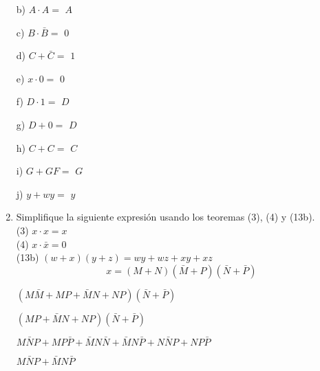 \documentclass[a4paper, 12pt]{article}
\newcommand{\Aspace}{0.2cm}
\begin{document}
\begin{enumerate}
            \vspace{\Aspace} \par
            b) $A \cdot A = $
            { \color{azul} $A$ }

            \vspace{\Aspace} \par
            c) $B \cdot \bar{B} = $
            { \color{azul} $0$ }

            \vspace{\Aspace} \par
            d) $C + \bar{C} = $
            { \color{azul} $1$ }

            \vspace{\Aspace} \par
            e) $x \cdot 0 = $
            { \color{azul} $0$ }

            \vspace{\Aspace} \par
            f) $D \cdot 1 = $
            { \color{azul} $D$ }

            \vspace{\Aspace} \par
            g) $D + 0 = $
            { \color{azul} $D$ }

            \vspace{\Aspace} \par
            h) $C + C = $
            { \color{azul} $C$ }

            \vspace{\Aspace} \par
            i) $G + GF = $
            { \color{azul} $G$ }

            \vspace{\Aspace} \par
            j) $y + wy = $
            { \color{azul} $y$ }


        \newpage
        \item Simplifique la siguiente expresión usando los teoremas (3), (4) y (13b).
        \\ (3) $x \cdot x = x$
        \\ (4) $x \cdot \bar{x} = 0$
        \\ (13b) $(w + x)(y + z) = wy + wz + xy + xz$
        \[ x = (M + N)(\bar{M} + P)(\bar{N} + \bar{P})\]
            \par
            { \color{azul} 
                        $(M\bar{M} + MP + \bar{M}N + NP)(\bar{N} + \bar{P})$
                \par    $(MP + \bar{M}N + NP)(\bar{N} + \bar{P})$
                \par    $M\bar{N}P + MP\bar{P} + \bar{M}N\bar{N} + \bar{M}N\bar{P} + N\bar{N}P + NP\bar{P}$
                \par    $M\bar{N}P + \bar{M}N\bar{P}$
            }



\end{enumerate}
\end{document}
